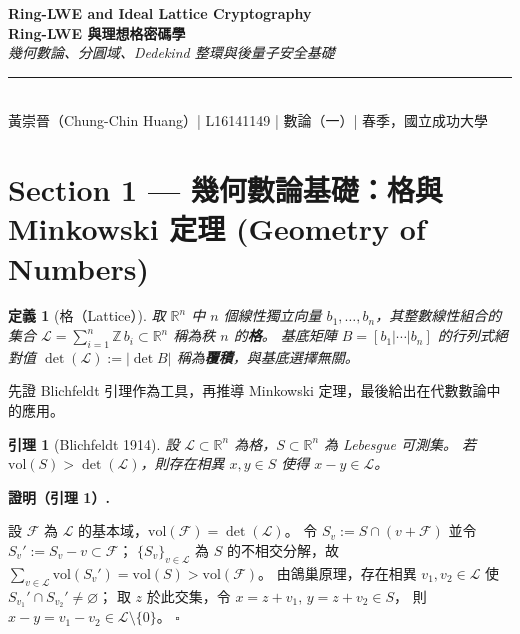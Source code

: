 \documentclass[10.5pt, a4paper]{article}
\theoremstyle{cpt}
\newtheorem{definition}{定義}
\newtheorem{lemma}{引理}
\newenvironment{proofbox}[1][證明]{%
  \begin{tcolorbox}[colback=thmfill, colframe=accent!40,
    breakable, left=5pt, right=5pt, top=3pt, bottom=3pt, boxrule=0.4pt]
  \noindent\textbf{\color{accent}#1.}\quad\small
}{%
  \hfill$\square$\end{tcolorbox}\vspace{-1pt}
}
\begin{document}
\begin{center}
  {\LARGE\bfseries\color{accent}
    Ring-LWE and Ideal Lattice Cryptography}\\[2pt]
  {\large\bfseries Ring-LWE 與理想格密碼學}\\[1pt]
  {\small\itshape\color{accent}
    幾何數論、分圓域、Dedekind 整環與後量子安全基礎}\\[5pt]
  \rule{\linewidth}{0.8pt}\\[2pt]
  {\small 黃崇晉（Chung-Chin Huang）\;|\; L16141149
    \;|\; 數論（一）\;| 春季，國立成功大學}
\end{center}

\vspace{1pt}

\section{Section 1 \;—\; 幾何數論基礎：格與 Minkowski 定理
  \textnormal{\small\color{gray}(Geometry of Numbers)}}

\begin{definition}[格（Lattice）]
  取 $\mathbb{R}^n$ 中 $n$ 個線性獨立向量 $b_1,\ldots,b_n$，其整數線性組合的集合
  $\mathcal{L}=\sum_{i=1}^n\mathbb{Z}\,b_i\subset\mathbb{R}^n$
  稱為秩 $n$ 的\textbf{格}。
  基底矩陣 $B=[b_1|\cdots|b_n]$ 的行列式絕對值
  $\det(\mathcal{L}):=|\det B|$ 稱為\textbf{覆積}，與基底選擇無關。
\end{definition}

先證 Blichfeldt 引理作為工具，再推導 Minkowski 定理，最後給出在代數數論中的應用。

\begin{lemma}[Blichfeldt 1914]
  設 $\mathcal{L}\subset\mathbb{R}^n$ 為格，$S\subset\mathbb{R}^n$ 為 Lebesgue 可測集。
  若 $\mathrm{vol}(S)>\det(\mathcal{L})$，則存在相異 $x,y\in S$ 使得 $x-y\in\mathcal{L}$。
\end{lemma}

\begin{proofbox}[證明（引理 1）]
  設 $\mathcal{F}$ 為 $\mathcal{L}$ 的基本域，$\mathrm{vol}(\mathcal{F})=\det(\mathcal{L})$。
  令 $S_v:=S\cap(v+\mathcal{F})$ 並令 $S_v':=S_v-v\subset\mathcal{F}$；
  $\{S_v\}_{v\in\mathcal{L}}$ 為 $S$ 的不相交分解，故
  $\sum_{v\in\mathcal{L}}\mathrm{vol}(S_v')=\mathrm{vol}(S)>\mathrm{vol}(\mathcal{F})$。
  由鴿巢原理，存在相異 $v_1,v_2\in\mathcal{L}$ 使 $S_{v_1}'\cap S_{v_2}'\neq\varnothing$；
  取 $z$ 於此交集，令 $x=z+v_1,\,y=z+v_2\in S$，
  則 $x-y=v_1-v_2\in\mathcal{L}\setminus\{0\}$。
\end{proofbox}
\end{document}
